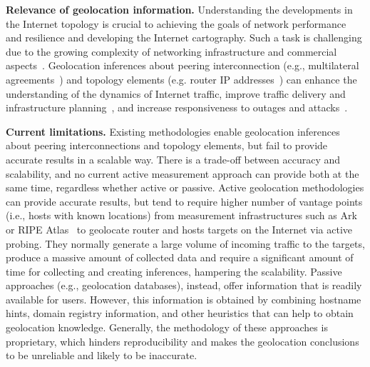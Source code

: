 	\textbf{Relevance of geolocation information.} 
	Understanding the developments in the Internet topology is crucial to achieving the goals of network performance and resilience and developing the Internet cartography. Such a task is challenging due to the growing complexity of networking infrastructure and commercial aspects~\cite{Giotsas:2015:MPI:2716281.2836122}. Geolocation inferences about peering interconnection (e.g., multilateral agreements~\cite{Giotsas:2013}) and topology elements (e.g. router IP addresses~\cite{8002903,Huffaker:2014:DDR:2656877.2656879}) can enhance the understanding of the dynamics of Internet traffic, improve traffic delivery and infrastructure planning~\cite{Calder:2013:MEG:2504730.2504754}, and increase responsiveness to outages and attacks~\cite{Giotsas:2017:DPI:3098822.3098855, marcos:2018:dynamix}. 


	\textbf{Current limitations.} Existing methodologies enable geolocation inferences about peering interconnections and topology elements, but fail to provide accurate results in a scalable way. There is a trade-off between accuracy and scalability, and no current active measurement approach can provide both at the same time, regardless whether active or passive. Active  geolocation methodologies can provide accurate results, but tend to require higher number of vantage points (i.e., hosts with known locations) from measurement infrastructures such as Ark~\cite{ark} or RIPE Atlas~\cite{ripeatlas} to geolocate router and hosts targets on the Internet via active probing. They normally generate a large volume of incoming traffic to the targets, produce a massive amount of collected data and require a significant amount of time for collecting and creating inferences, hampering the scalability.  Passive approaches (e.g., geolocation databases), instead, offer information that is readily available for users. However, this information is obtained by combining hostname hints, domain registry information, and other heuristics that can help to obtain geolocation knowledge. Generally, the methodology of these approaches is proprietary, which hinders reproducibility and makes the geolocation conclusions to be unreliable and likely to be inaccurate.

